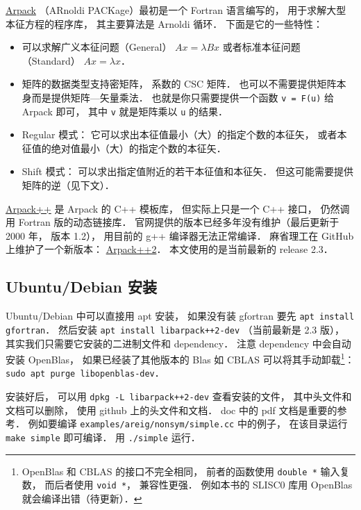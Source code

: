 

\href{https://www.caam.rice.edu/software/ARPACK/}{Arpack} （ARnoldi PACKage）最初是一个 Fortran 语言编写的， 用于求解大型本征方程的程序库， 其主要算法是 Arnoldi 循环． 下面是它的一些特性：
\begin{itemize}
\item 可以求解广义本征问题（General） $Ax = \lambda Bx$ 或者标准本征问题（Standard） $Ax = \lambda x$．
\item 矩阵的数据类型支持密矩阵， 系数的 CSC 矩阵． 也可以不需要提供矩阵本身而是提供矩阵—矢量乘法． 也就是你只需要提供一个函数 \verb|v = F(u)| 给 Arpack 即可， 其中 \verb|v| 就是矩阵乘以 \verb|u| 的结果．
\item Regular 模式： 它可以求出本征值最小（大）的指定个数的本征矢， 或者本征值的绝对值最小（大）的指定个数的本征矢．
\item Shift 模式： 可以求出指定值附近的若干本征值和本征矢． 但这可能需要提供矩阵的逆（见下文）．
\end{itemize}

\href{http://www.ime.unicamp.br/~chico/arpack++/}{Arpack++} 是 Arpack 的 C++ 模板库， 但实际上只是一个 C++ 接口， 仍然调用 Fortran 版的动态链接库． 官网提供的版本已经多年没有维护（最后更新于 2000 年， 版本 1.2）， 用目前的 g++ 编译器无法正常编译． 麻省理工在 GitHub 上维护了一个新版本： \href{https://github.com/m-reuter/arpackpp}{Arpack++2}． 本文使用的是当前最新的 release 2.3．

\subsection{Ubuntu/Debian 安装}
Ubuntu/Debian 中可以直接用 apt 安装， 如果没有装 gfortran 要先 \verb|apt install gfortran|． 然后安装 \verb|apt install libarpack++2-dev| （当前最新是 2.3 版）， 其实我们只需要它安装的二进制文件和 dependency． 注意 dependency 中会自动安装 OpenBlas， 如果已经装了其他版本的 Blas 如 CBLAS 可以将其手动卸载\footnote{OpenBlas 和 CBLAS 的接口不完全相同， 前者的函数使用 \lstinline|double *| 输入复数， 而后者使用 \verb|void *|， 兼容性更强． 例如本书的 SLISC0 库用 OpenBlas 就会编译出错（待更新）．}： \verb|sudo apt purge libopenblas-dev|．

安装好后， 可以用 \verb|dpkg -L libarpack++2-dev| 查看安装的文件， 其中头文件和文档可以删除， 使用 github 上的头文件和文档． doc 中的 pdf 文档是重要的参考． 例如要编译 \verb|examples/areig/nonsym/simple.cc| 中的例子， 在该目录运行 \verb|make simple| 即可编译． 用 \verb|./simple| 运行．

